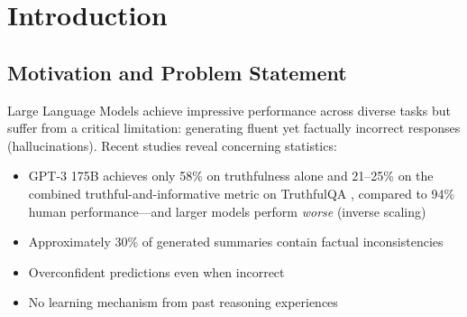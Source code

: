 \documentclass[12pt,a4paper]{article}
\theoremstyle{definition}
\begin{document}
\newpage

\tableofcontents
\newpage

\section{Introduction}

\subsection{Motivation and Problem Statement}

Large Language Models achieve impressive performance across diverse tasks but suffer from a critical limitation: generating fluent yet factually incorrect responses (hallucinations). Recent studies reveal concerning statistics:

\begin{itemize}
    \item GPT-3 175B achieves only 58\% on truthfulness alone and 21--25\% on the combined truthful-and-informative metric on TruthfulQA \cite{lin2022truthfulqa}, compared to 94\% human performance---and larger models perform \textit{worse} (inverse scaling)
    \item Approximately 30\% of generated summaries contain factual inconsistencies
    \item Overconfident predictions even when incorrect
    \item No learning mechanism from past reasoning experiences
\end{itemize}
\end{document}
